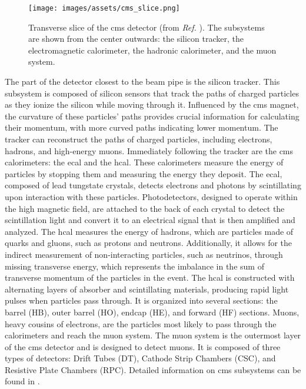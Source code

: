 \begin{figure}[h]
	\centering
	\texttt{[image: images/assets/cms\_slice.png]}
	\caption[Transverse slice of CMS detector]{Transverse slice of the \acrshort{cms} detector (from \textit{Ref.} \cite{Barney:2120661}). The subsystems are shown from the center outwards: the silicon tracker, the electromagnetic calorimeter, the hadronic calorimeter, and the muon system.}
	\label{fig:cms_slice}
\end{figure}


The part of the detector closest to the beam pipe is the silicon tracker. This subsystem is composed of silicon sensors that track the paths of charged particles as they ionize the silicon while moving through it. Influenced by the \acrshort{cms} magnet, the curvature of these particles' paths provides crucial information for calculating their momentum, with more curved paths indicating lower momentum. The tracker can reconstruct the paths of charged particles, including electrons, hadrons, and high-energy muons. Immediately following the tracker are the \acrshort{cms} calorimeters: the \acrfull{ecal} and the \acrfull{hcal}. These calorimeters measure the energy of particles by stopping them and measuring the energy they deposit. The \acrshort{ecal}, composed of lead tungstate crystals, detects electrons and photons by scintillating upon interaction with these particles. Photodetectors, designed to operate within the high magnetic field, are attached to the back of each crystal to detect the scintillation light and convert it to an electrical signal that is then amplified and analyzed. The \acrshort{hcal} measures the energy of hadrons, which are particles made of quarks and gluons, such as protons and neutrons. Additionally, it allows for the indirect measurement of non-interacting particles, such as neutrinos, through missing transverse energy, which represents the imbalance in the sum of transverse momentum of the particles in the event. The \acrshort{hcal} is constructed with alternating layers of absorber and scintillating materials, producing rapid light pulses when particles pass through. It is organized into several sections: the barrel (HB), outer barrel (HO), endcap (HE), and forward (HF) sections. Muons, heavy cousins of electrons, are the particles most likely to pass through the calorimeters and reach the muon system. The muon system is the outermost layer of the \acrshort{cms} detector and is designed to detect muons. It is composed of three types of detectors: Drift Tubes (DT), Cathode Strip Chambers (CSC), and Resistive Plate Chambers (RPC). Detailed information on \acrshort{cms} subsystems can be found in \cite{CERN-LHCC-2020-004}.


